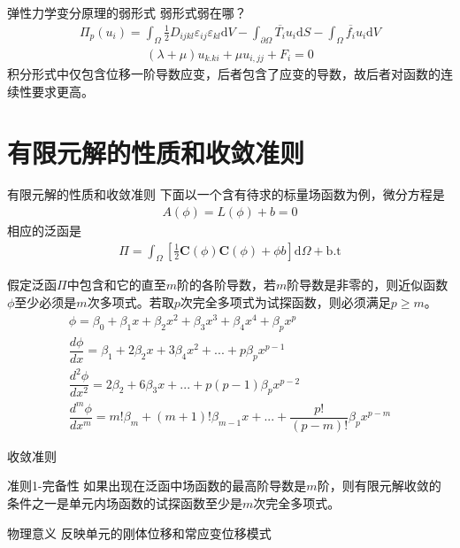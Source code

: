 \documentclass[11pt]{beamer}
\begin{document}
\begin{frame}{弹性力学变分原理的弱形式}
弱形式弱在哪？
\begin{align*}
\Pi_p(u_i)=\int_\Omega\frac{1}{2}D_{ijkl}\varepsilon_{ij}\varepsilon_{kl}\mathrm{d}V-\int_{\partial\Omega}\overline{T_i}u_i\mathrm{d}S-\int_\Omega\overline{f_i}u_i\mathrm{d}V
\end{align*}
\begin{align*}
(\lambda+\mu)u_{k.ki}+\mu u_{i,jj}+F_i = 0
\end{align*}
积分形式中仅包含位移一阶导数应变，后者包含了应变的导数，故后者对函数的连续性要求更高。
\end{frame}


\section{有限元解的性质和收敛准则}
\begin{frame}{有限元解的性质和收敛准则}
下面以一个含有待求的标量场函数为例，微分方程是
\begin{align*}
A(\phi)=L(\phi)+b=0
\end{align*}
相应的泛函是
\begin{align*}
\Pi = \int_\Omega\left[\frac{1}{2}\textbf{C}(\phi)\textbf{C}(\phi)+\phi b\right] \mathrm{d}\Omega +\mathrm{b.t}
\end{align*}
\end{frame}

\begin{frame}
假定泛函$\Pi$中包含和它的直至$m$阶的各阶导数，若$m$阶导数是非零的，则近似函数$\phi$至少必须是$m$次多项式。若取$p$次完全多项式为试探函数，则必须满足$p\ge m$。
\begin{align*}
\phi=\beta_{0}+\beta_{1}x+\beta_{2}x^{2}+\beta_{3}x^{3}+\beta_{4}x^{4}+\beta_{p}x^{p}\\
\dfrac{d\phi}{dx}=\beta_{1}+2\beta_{2}x+3\beta_{4}x^{2}+...+p\beta_{p}x^{p-1}\\
\dfrac{d^{2}\phi}{dx^{2}}=2\beta_{2}+6\beta_{3}x+...+p(p-1)\beta_{p}x^{p-2}\\
\dfrac{d^{m}\phi}{dx^{m}}=m!\beta_{m}+(m+1)!\beta_{m-1}x+...+\dfrac{p!}{(p-m)!}\beta_{p}x^{p-m}
\end{align*}
\end{frame}

\begin{frame}{收敛准则}
\begin{block}{准则1-完备性}
如果出现在泛函中场函数的最高阶导数是$m$阶，则有限元解收敛的条件之一是单元内场函数的试探函数至少是$m$次完全多项式。
\end{block}
\begin{block}{物理意义}
反映单元的刚体位移和常应变位移模式
\end{block}
\end{frame}
\end{document}
